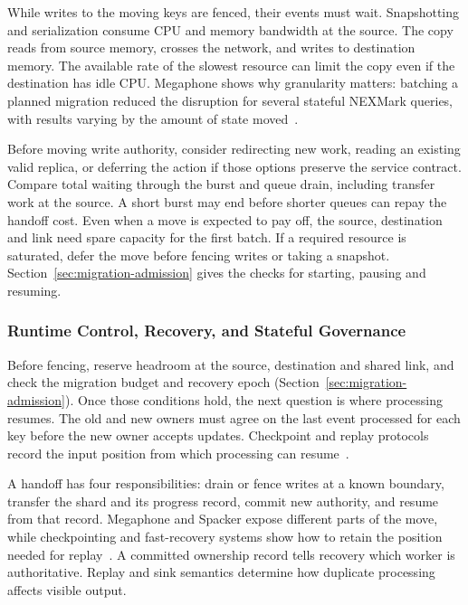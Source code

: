 \documentclass[manuscript]{acmart}
\begin{document}
While writes to the moving keys are fenced, their events must wait. Snapshotting and serialization consume CPU and memory bandwidth at the source. The copy reads from source memory, crosses the network, and writes to destination memory. The available rate of the slowest resource can limit the copy even if the destination has idle CPU. Megaphone shows why granularity matters: batching a planned migration reduced the disruption for several stateful NEXMark queries, with results varying by the amount of state moved~\cite{nasir2019megaphone}.

Before moving write authority, consider redirecting new work, reading an existing valid replica, or deferring the action if those options preserve the service contract. Compare total waiting through the burst and queue drain, including transfer work at the source. A short burst may end before shorter queues can repay the handoff cost. Even when a move is expected to pay off, the source, destination and link need spare capacity for the first batch. If a required resource is saturated, defer the move before fencing writes or taking a snapshot. Section~\ref{sec:migration-admission} gives the checks for starting, pausing and resuming.

\subsubsection{Runtime Control, Recovery, and Stateful Governance}

Before fencing, reserve headroom at the source, destination and shared link, and check the migration budget and recovery epoch (Section~\ref{sec:migration-admission}). Once those conditions hold, the next question is where processing resumes. The old and new owners must agree on the last event processed for each key before the new owner accepts updates. Checkpoint and replay protocols record the input position from which processing can resume~\cite{carbone2015asynchronous,zhao2024recovery}.

A handoff has four responsibilities: drain or fence writes at a known boundary, transfer the shard and its progress record, commit new authority, and resume from that record. Megaphone and Spacker expose different parts of the move, while checkpointing and fast-recovery systems show how to retain the position needed for replay~\cite{nasir2019megaphone,mao2025spacker,carbone2015asynchronous,zhao2024recovery}. A committed ownership record tells recovery which worker is authoritative. Replay and sink semantics determine how duplicate processing affects visible output.
\end{document}

